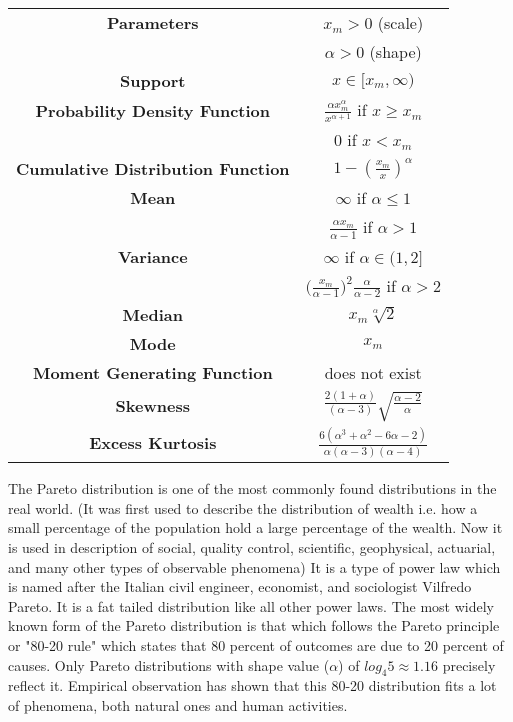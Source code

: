 \documentclass[14pt, a4paper]{article}
\theoremstyle{definition}
\begin{document}
\begin{center}
    \begin{tabular}{|c|c|}  %
\hline
 \textbf{Parameters }& $x_m > 0$ (scale) \\ & $\alpha >0$ (shape) \\
 \hline
 \textbf{Support} & $x \in [x_m, \infty)$ \\
 \hline
 \textbf{Probability Density Function} & $\frac{\alpha x_m^\alpha}{x^{\alpha +1}}$ if $x \geq x_m$ \\ & $0$ if $x < x_m$ \\
 \hline
 \textbf{Cumulative Distribution Function} &  $1 - (\frac{x_m}{x})^\alpha$ \\
 \hline
 \textbf{Mean} & $\infty$ if $\alpha \leq 1$ \\ & $\frac{\alpha x_m}{\alpha - 1}$ if $\alpha > 1$ \\ 
 \hline
 \textbf{Variance} & $\infty$ if $\alpha \in (1,2] $ \\ & $\big( \frac{x_m}{\alpha - 1}\big) ^2 \frac{\alpha}{\alpha - 2}$ if $\alpha > 2$\\
 \hline
 \textbf{Median} & $x_m  \sqrt[\alpha]{2}$ \\ 
 \hline
 \textbf{Mode} & $x_m$\\
 \hline
 \textbf{Moment Generating Function} & does not exist \\
 \hline
 \textbf{Skewness} & $\frac{2(1+\alpha)}{(\alpha - 3)} \sqrt{\frac{\alpha - 2}{\alpha}}$\\
 \hline
 \textbf{Excess Kurtosis} & $\frac{6(\alpha^3 +\alpha^2 - 6\alpha -2 )}{\alpha(\alpha - 3)(\alpha - 4)}$ \\
 \hline
       
  \end{tabular}
\end{center}



The Pareto distribution is one of the most commonly found distributions in the real world. (It was first used to describe the distribution of wealth i.e. how a small percentage of the population hold a large percentage of the wealth. Now it is used in description of social, quality control, scientific, geophysical, actuarial, and many other types of observable phenomena) It is a type of power law which is named after the Italian civil engineer, economist, and sociologist Vilfredo Pareto. It is a fat tailed distribution like all other power laws. The most widely known form of the Pareto distribution is that which follows the Pareto principle or "80-20 rule" which states that 80 percent of outcomes are due to 20 percent of causes. Only Pareto distributions with shape value ($\alpha$) of $log_4 5 \approx 1.16$ precisely reflect it. Empirical observation has shown that this 80-20 distribution fits a lot of phenomena, both natural ones and human activities.
\end{document}

